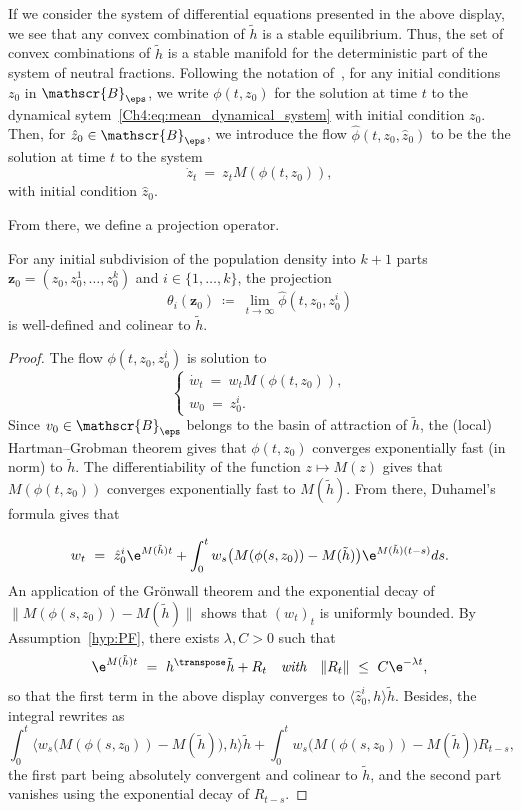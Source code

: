 \begin{refsegment}
 If we consider the system of differential equations presented in the above display, we see that any convex combination of $\tilde{h}$ is a stable equilibrium. Thus, the set of convex combinations of $\tilde h$ is a stable manifold for the deterministic part of the system of neutral fractions. 
 Following the notation of~\cite{Julie_Zsofia}, for any initial conditions $z_0$ in $\mathscr{B}_{\eps}$, we write $\phi(t,z_0)$ for the solution at time $t$ to the dynamical sytem~\eqref{Ch4:eq:mean_dynamical_system} with initial condition $z_0$. Then, for $\hat z_0\in\mathscr{B}_\eps$, we introduce  the flow $\hat \phi(t, z_0, \hat z_0)$ to be the the solution at time $t$ to the system
 \[
 \dot{z}_t\ =\ z_t M(\phi(t,z_0)),
 \]
with initial condition $\hat z_0$. 

From there, we define a projection operator.
\begin{propdef}
  For any initial subdivision of the population density into $k+1$ parts $\bm z_0=(z_0,z^1_0,\ldots, z^k_0)$ and $i\in\{1,\ldots,k\}$, the projection
  \begin{equation}\label{Ch4:eq:def_katz_proj} 
\theta_i(\bm z_0)\ \coloneqq\ \lim_{t\to\infty} \hat\phi(t, z_0, z^i_0)
\end{equation}
  is well-defined and colinear to $\tilde h$.
\end{propdef}
\begin{proof}
The flow $\phi(t, z_0, z^i_0)$ is solution to
 \[
 \begin{cases}
 \dot{w}_t\ =\ w_t M(\phi(t,z_0)),\\
 w_0\ =\ z^i_0.
 \end{cases}
 \]
 Since $v_0\in \mathscr{B}_{\eps}$ belongs to the basin of attraction of $\tilde h$, the (local) Hartman--Grobman theorem gives that $\phi(t,z_0)$ converges exponentially fast (in norm) to $\tilde h$. The differentiability of the function $z\mapsto M(z)$ gives that $M(\phi(t,z_0))$ converges exponentially fast to $ M(\tilde h)$.
From there, Duhamel's formula gives that

\[
w_t\ =\ \hat z^i_0 \e^{M(\tilde h)t} + \int_0^t w_s\big(M(\phi(s,z_0))-M(\tilde h)\big)\e^{M(\tilde h)(t-s)}ds.
\] 
An application of the Grönwall theorem and the exponential decay of 
$\lVert M(\phi(s,z_0))-M(\tilde h)\rVert$ shows that $(w_t)_t$ is uniformly bounded.
By Assumption~\ref{hyp:PF}, there exists $\lambda, C >0$ such that
\[
\e^{M(\tilde h)t}\ =\ h^\transpose\tilde h+ R_t\quad \textit{with} \quad \lVert R_t\rVert\ \leq \ C\e^{- \lambda t},
\]
so that the first term in the above display converges to $\langle \hat z^i_0, h \rangle \tilde h$. Besides, 
the integral rewrites as 
\[
\int_0^t \langle w_s \big(M(\phi(s,z_0))-M(\tilde h)\big), h \rangle\tilde h + \int_0^t w_s \big(M(\phi(s,z_0))-M(\tilde h)\big)R_{t-s},
 \]
the first part being absolutely convergent and colinear to $\tilde h$, and the second part vanishes using the exponential decay of $R_{t-s}$.


\end{proof}
\end{refsegment}
